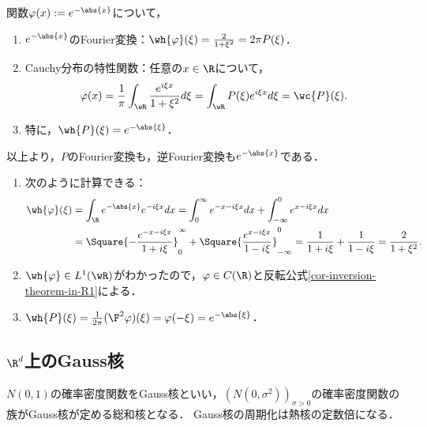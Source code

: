 \documentclass[uplatex,dvipdfmx]{jsreport}
\begin{document}
\begin{theorem}[$\R$上のPoisson核のFourier変換]
    関数$\varphi(x):=e^{-\abs{x}}$について，
    \begin{enumerate}
        \item $e^{-\abs{x}}$のFourier変換：$\wh{\varphi}(\xi)=\frac{2}{1+\xi^2}=2\pi P(\xi)$．
        \item Cauchy分布の特性関数：任意の$x\in\R$について，
        \[\varphi(x)=\frac{1}{\pi}\int_{\wR}\frac{e^{i\xi x}}{1+\xi^2}d\xi=\int_{\wR} P(\xi)e^{i\xi x}d\xi=\wc{P}(\xi).\]
        \item 特に，$\wh{P}(\xi)=e^{-\abs{\xi}}$．
    \end{enumerate}
    以上より，$P$のFourier変換も，逆Fourier変換も$e^{-\abs{x}}$である．
\end{theorem}
\begin{Proof}\mbox{}
    \begin{enumerate}
        \item 次のように計算できる：
        \begin{align*}
            \wh{\varphi}(\xi)&=\int_\R e^{-\abs{x}}e^{-i\xi x}dx=\int^\infty_0e^{-x-i\xi x}dx+\int^0_{-\infty}e^{x-i\xi x}dx\\
            &=\Square{-\frac{e^{-x-i\xi x}}{1+i\xi}}^\infty_0+\Square{\frac{e^{x-i\xi x}}{1-i\xi}}^0_{-\infty}=\frac{1}{1+i\xi}+\frac{1}{1-i\xi}=\frac{2}{1+\xi^2}.
        \end{align*}
        \item $\wh{\varphi}\in L^1(\wR)$がわかったので，$\varphi\in C(\R)$と反転公式\ref{cor-inversion-theorem-in-R1}による．
        \item $\wh{P}(\xi)=\frac{1}{2\pi}(\F^2\varphi)(\xi)=\varphi(-\xi)=e^{-\abs{\xi}}$．
    \end{enumerate}
\end{Proof}

\subsection{$\R^d$上のGauss核}

\begin{tcolorbox}[colframe=ForestGreen, colback=ForestGreen!10!white,breakable,colbacktitle=ForestGreen!40!white,coltitle=black,fonttitle=\bfseries\sffamily,
title=]
    $N(0,1)$の確率密度関数をGauss核といい，$(N(0,\sigma^2))_{\sigma>0}$の確率密度関数の族がGauss核が定める総和核となる．
    Gauss核の周期化は熱核の定数倍になる．
\end{tcolorbox}
\end{document}
